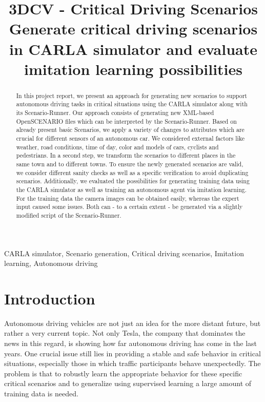 \documentclass[conference, a4paper, 11pt]{IEEEtran}
\begin{document}
	
	\title{3DCV - Critical Driving Scenarios\\
		{\small Generate critical driving scenarios in CARLA simulator and evaluate imitation learning possibilities}
	}
	
	\author{
		\and
		\and
		\and
	}
	
	\maketitle
	
	\begin{abstract}
		In this project report, we present an approach for generating new scenarios to support autonomous driving tasks in critical situations using the CARLA simulator along with its Scenario-Runner. Our approach consists of generating new XML-based OpenSCENARIO files which can be interpreted by the Scenario-Runner. Based on already present basic Scenarios, we apply a variety  of changes to attributes which are crucial for different sensors of an autonomous car. We considered external factors like weather, road conditions, time of day, color and models of cars, cyclists and pedestrians. In a second step, we transform the scenarios to different places in the same town and to different towns. To ensure the newly generated scenarios are valid, we consider different sanity checks as well as a specific verification to avoid duplicating scenarios.
		Additionally, we evaluated the possibilities for generating training data using the CARLA simulator as well as training an autonomous agent via imitation learning. For the training data the camera images can be obtained easily, whereas the expert input caused some issues. Both can - to a certain extent - be generated via a slightly modified script of the Scenario-Runner.
		
	\end{abstract}
	
	\begin{IEEEkeywords}
		CARLA simulator, Scenario generation, Critical driving scenarios, Imitation learning, Autonomous driving
	\end{IEEEkeywords}
	
	\section{Introduction}
	Autonomous driving vehicles are not just an idea for the more distant future, but rather a very current topic.
	Not only Tesla, the company that dominates the news in this regard, is showing how far autonomous driving has come in the last years.
	One crucial issue still lies in providing a stable and safe behavior in critical situations, especially those in which traffic participants behave unexpectedly. 
	The problem is that to robustly learn the appropriate behavior for these specific critical scenarios and to generalize using supervised learning a large amount of training data is needed.
	
\end{document}
